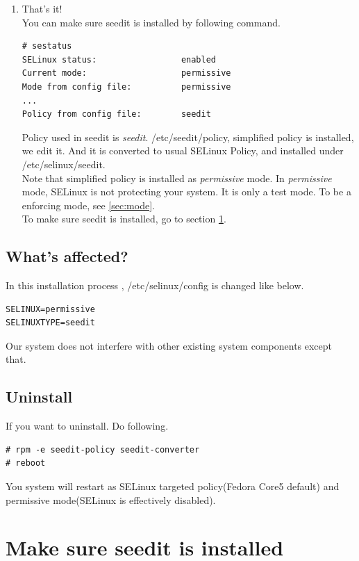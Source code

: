 \documentclass{article}
\begin{document}
\begin{enumerate}
 \item That's it!\\
You can make sure seedit is installed by following command.
\begin{verbatim}
# sestatus
SELinux status:                 enabled
Current mode:                   permissive
Mode from config file:          permissive
...
Policy from config file:        seedit
\end{verbatim}

Policy used in seedit is {\it seedit}.
/etc/seedit/policy, simplified policy is installed, we edit it.
And it is converted to usual SELinux Policy, and installed under  /etc/selinux/seedit.\\
Note that simplified policy is installed as {\it permissive} mode.
In {\it permissive} mode, SELinux is not protecting your system. It is
 only a test mode. To be a enforcing mode, see \ref{sec:mode}.\\
To make sure seedit is installed, go to section \ref{sec:makesure}.
\end{enumerate}

 \subsection{What's affected?}
 In this installation process ,
/etc/selinux/config is changed like below.
\begin{verbatim}
SELINUX=permissive	
SELINUXTYPE=seedit
\end{verbatim}
Our system does not interfere with other existing system components
except that.
\subsection{Uninstall}
If you want to uninstall. Do following.
\begin{verbatim}
# rpm -e seedit-policy seedit-converter	
# reboot
\end{verbatim}
You system will restart as SELinux targeted policy(Fedora Core5 default)
and permissive mode(SELinux is effectively disabled).

\section{Make sure seedit is installed}\label{sec:makesure}
\end{document}
